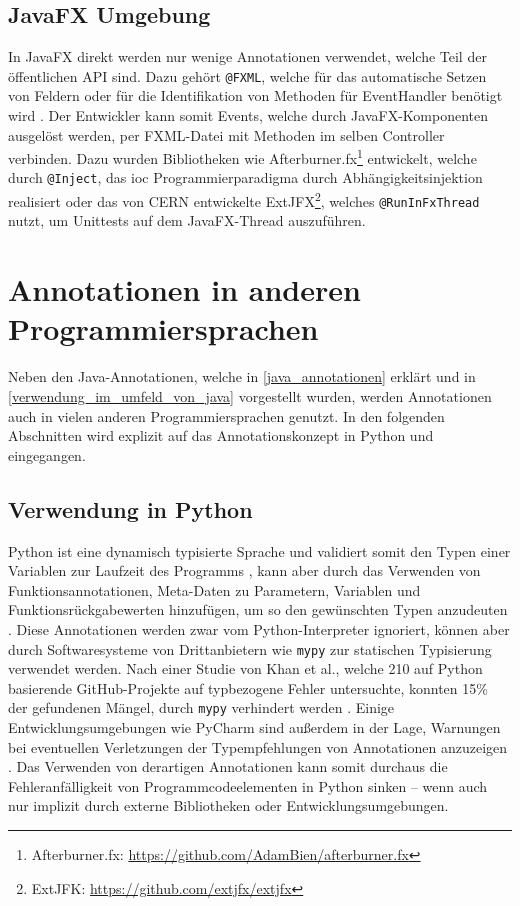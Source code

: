 \subsection{JavaFX Umgebung}
\label{verwendung_im_umfeld_von_java_fx}
In JavaFX direkt werden nur wenige Annotationen verwendet, welche Teil der öffentlichen API sind. Dazu gehört \texttt{@FXML}, welche für das automatische Setzen von Feldern oder für die Identifikation von Methoden für EventHandler benötigt wird \cite{Anderson2019}. Der Entwickler kann somit Events, welche durch JavaFX-Komponenten ausgelöst werden, per FXML-Datei mit Methoden im selben Controller verbinden. Dazu wurden Bibliotheken wie Afterburner.fx\footnote{\label{ft:afterburner}Afterburner.fx: \url{https://github.com/AdamBien/afterburner.fx}} entwickelt, welche durch \texttt{@Inject}, das \ac{ioc} Programmierparadigma durch Abhängigkeitsinjektion realisiert oder das von CERN entwickelte ExtJFX\footnote{ExtJFK: \url{https://github.com/extjfx/extjfx}}, welches \texttt{@RunInFxThread} nutzt, um Unittests auf dem JavaFX-Thread auszuführen. 

\section{Annotationen in anderen Programmiersprachen}
\label{verwendung_in_anderen_sprachen}
Neben den Java-Annotationen, welche in \autoref{java_annotationen} erklärt und in \autoref{verwendung_im_umfeld_von_java} vorgestellt wurden, werden Annotationen auch in vielen anderen Programmiersprachen genutzt. In den folgenden Abschnitten wird explizit auf das Annotationskonzept in Python und \csharp eingegangen.
\subsection{Verwendung in Python}
\label{verwendung_in_python}
Python ist eine dynamisch typisierte Sprache und validiert somit den Typen einer Variablen zur Laufzeit des Programms \cite{Tratt2009}, kann aber durch das Verwenden von Funktionsannotationen, Meta-Daten zu Parametern, Variablen und Funktionsrückgabewerten hinzufügen, um so den gewünschten Typen anzudeuten \cite{Rossum2014, Winter2006}. Diese Annotationen werden zwar vom Python-Interpreter ignoriert, können aber durch Softwaresysteme von Drittanbietern wie \texttt{mypy} zur statischen Typisierung verwendet werden. Nach einer Studie von Khan et al., welche 210 auf Python basierende GitHub-Projekte auf typbezogene Fehler untersuchte, konnten 15\% der gefundenen Mängel, durch \texttt{mypy} verhindert werden \cite{Khan2021}.
Einige Entwicklungsumgebungen wie PyCharm sind außerdem in der Lage, Warnungen bei eventuellen Verletzungen der Typempfehlungen von Annotationen anzuzeigen \cite{Rother2017}. Das Verwenden von derartigen Annotationen kann somit durchaus die Fehleranfälligkeit von Programmcodeelementen in Python sinken -- wenn auch nur implizit durch externe Bibliotheken oder Entwicklungsumgebungen.

